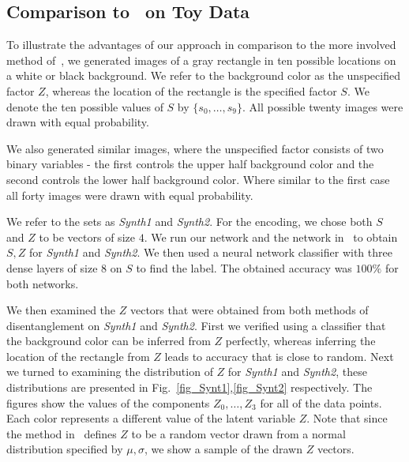 \documentclass[10pt,twocolumn,letterpaper]{article}
\begin{document}
\subsection{Comparison to~\cite{disentanglement} on Toy Data}
To illustrate the advantages of our approach in comparison to the more involved method of~\cite{disentanglement}, we generated images of a gray rectangle in ten possible locations on a white or black background. We refer to the background color as the unspecified factor $Z$, whereas the location of the rectangle is the specified factor $S$. We denote the ten possible values of $S$ by $\{s_0,\dots,s_9\}$. All possible twenty images were drawn with equal probability. 

 We also generated similar images, where the unspecified factor consists of two binary variables - the first controls the upper half background color and the second controls the lower half background color. Where similar to the first case all forty images were drawn with equal probability. 
 
We refer to the sets as \textit{Synth1} and  \textit{Synth2}. 
For the encoding, we chose both $S$ and $Z$ to be vectors of size $4$. We run our network and the network in~\cite{disentanglement} to obtain $S,Z$ for \textit{Synth1} and  \textit{Synth2}. We then used a neural network classifier with three dense layers of size $8$ on $S$ to find the label. The obtained accuracy was $100\%$ for both networks. 

We then examined the $Z$ vectors that were obtained from both methods of disentanglement on \textit{Synth1} and \textit{Synth2}. First we verified using a classifier that the background color can be inferred from $Z$ perfectly, whereas inferring the location of the rectangle from $Z$ leads to accuracy that is close to random. Next we turned to examining the distribution of $Z$ for \textit{Synth1} and \textit{Synth2}, these distributions are presented in Fig.~\ref{fig_Synt1},\ref{fig_Synt2} respectively. The figures show the values of the components $Z_0,\dots,Z_3$ for all of the data points. Each color represents a different value of the latent variable $Z$. Note that since the method in~\cite{disentanglement} defines $Z$ to be a random vector drawn from a normal distribution specified by $\mu,\sigma$, we show a sample of the drawn $Z$ vectors. 
\end{document}
